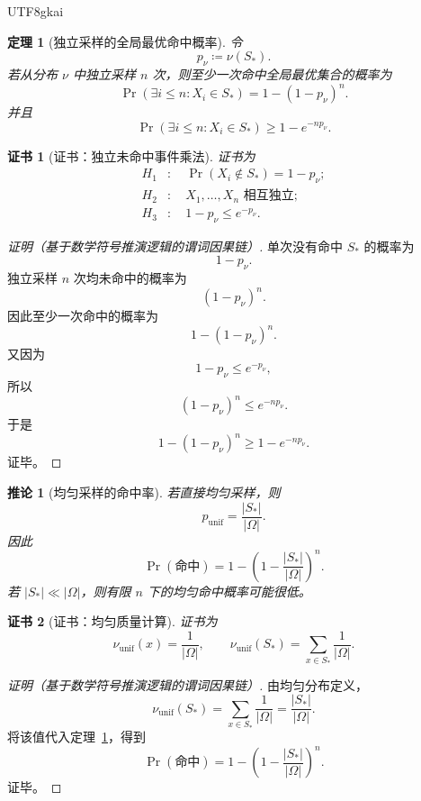 \documentclass[12pt]{article}
\newtheorem{theorem}{定理}[section]
\newtheorem{corollary}{推论}[section]
\newtheorem{Certificate}{证书}[section]
\newcommand{\DefEq}{\coloneqq}
\newcommand{\Unif}{\mathrm{unif}}
\begin{document}
\begin{CJK*}{UTF8}{gkai}
\begin{theorem}[独立采样的全局最优命中概率]
\label{thm:tex55-hit-probability}
令
\[
  p_{\nu}\DefEq\nu(S_*).
\]
若从分布 \(\nu\) 中独立采样 \(n\) 次，则至少一次命中全局最优集合的概率为
\[
  \Pr(\exists i\le n:X_i\in S_*)
  =
  1-(1-p_{\nu})^n.
\]
并且
\[
  \Pr(\exists i\le n:X_i\in S_*)
  \ge
  1-e^{-np_{\nu}}.
\]
\end{theorem}

\begin{Certificate}[证书：独立未命中事件乘法]
\label{cert:tex55-hit-probability}
证书为
\[
\begin{aligned}
  H_1&:\quad \Pr(X_i\notin S_*)=1-p_{\nu};\\
  H_2&:\quad X_1,\ldots,X_n\text{ 相互独立};\\
  H_3&:\quad 1-p_{\nu}\le e^{-p_{\nu}}.
\end{aligned}
\]
\end{Certificate}

\begin{proof}[证明（基于数学符号推演逻辑的谓词因果链）]
单次没有命中 \(S_*\) 的概率为
\[
  1-p_{\nu}.
\]
独立采样 \(n\) 次均未命中的概率为
\[
  (1-p_{\nu})^n.
\]
因此至少一次命中的概率为
\[
  1-(1-p_{\nu})^n.
\]
又因为
\[
  1-p_{\nu}\le e^{-p_{\nu}},
\]
所以
\[
  (1-p_{\nu})^n\le e^{-np_{\nu}}.
\]
于是
\[
  1-(1-p_{\nu})^n
  \ge
  1-e^{-np_{\nu}}.
\]
证毕。
\end{proof}

\begin{corollary}[均匀采样的命中率]
\label{cor:tex55-uniform-hit}
若直接均匀采样，则
\[
  p_{\Unif}
  =
  \frac{|S_*|}{|\Omega|}.
\]
因此
\[
  \Pr(\text{命中})
  =
  1-
  \left(
  1-\frac{|S_*|}{|\Omega|}
  \right)^n.
\]
若 \(|S_*|\ll|\Omega|\)，则有限 \(n\) 下的均匀命中概率可能很低。
\end{corollary}

\begin{Certificate}[证书：均匀质量计算]
\label{cert:tex55-uniform-hit}
证书为
\[
  \nu_{\Unif}(x)=\frac1{|\Omega|},
  \qquad
  \nu_{\Unif}(S_*)=\sum_{x\in S_*}\frac1{|\Omega|}.
\]
\end{Certificate}

\begin{proof}[证明（基于数学符号推演逻辑的谓词因果链）]
由均匀分布定义，
\[
  \nu_{\Unif}(S_*)
  =
  \sum_{x\in S_*}\frac1{|\Omega|}
  =
  \frac{|S_*|}{|\Omega|}.
\]
将该值代入定理~\ref{thm:tex55-hit-probability}，得到
\[
  \Pr(\text{命中})
  =
  1-
  \left(
  1-\frac{|S_*|}{|\Omega|}
  \right)^n.
\]
证毕。
\end{proof}


\end{CJK*}
\end{document}
